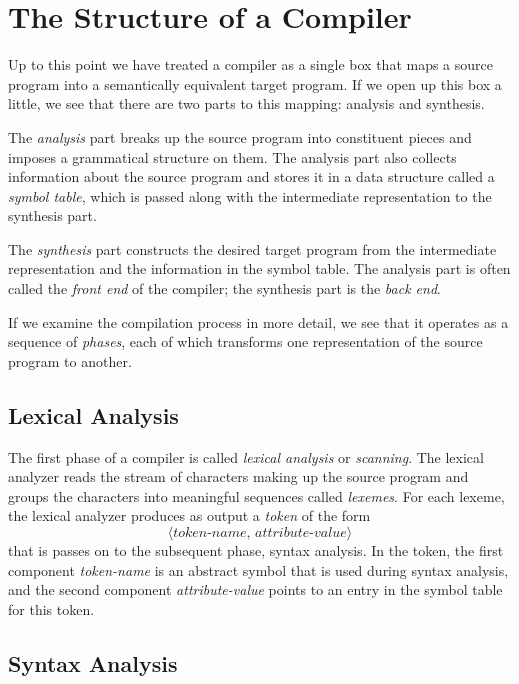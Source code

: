 \documentclass[12pt,a4paper,twoside,openany]{book}
\begin{document}
\section{The Structure of a Compiler}

Up to this point we have treated a compiler as a single box that maps a source program into a semantically equivalent target program. If we open up this box a little, we see that there are two parts to this mapping: analysis and synthesis.

The \textit{analysis} part breaks up the source program into constituent pieces and imposes a grammatical structure on them. The analysis part also collects information about the source program and stores it in a data structure called a \textit{symbol table}, which is passed along with the intermediate representation to the synthesis part.

The \textit{synthesis} part constructs the desired target program from the intermediate representation and the information in the symbol table. The analysis part is often called the \textit{front end} of the compiler; the synthesis part is the \textit{back end}.

If we examine the compilation process in more detail, we see that it operates as a sequence of \textit{phases}, each of which transforms one representation of the source program to another.

\subsection{Lexical Analysis}

The first phase of a compiler is called \textit{lexical analysis} or \textit{scanning}. The lexical analyzer reads the stream of characters making up the source program and groups the characters into meaningful sequences called \textit{lexemes}. For each lexeme, the lexical analyzer produces as output a \textit{token} of the form $$\langle\textit{token-name, attribute-value}\rangle$$ that is passes on to the subsequent phase, syntax analysis. In the token, the first component \textit{token-name} is an abstract symbol that is used during syntax analysis, and the second component \textit{attribute-value} points to an entry in the symbol table for this token.

\subsection{Syntax Analysis}
\end{document}
